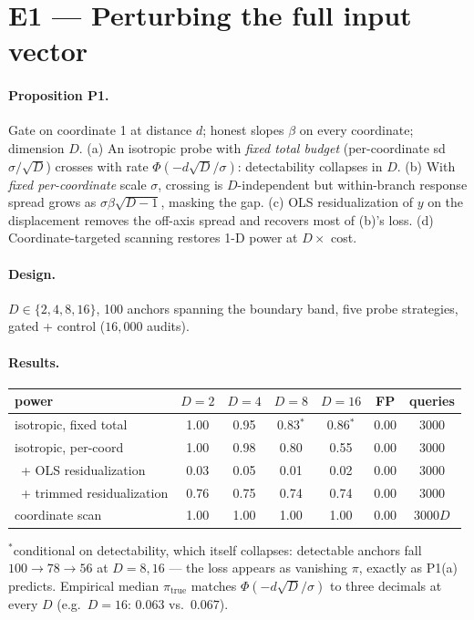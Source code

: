 \documentclass[11pt]{article}
\begin{document}
\section{E1 --- Perturbing the full input vector}

\paragraph{Proposition P1.} Gate on coordinate 1 at distance $d$; honest slopes $\beta$ on
every coordinate; dimension $D$.
(a) An isotropic probe with \emph{fixed total budget} (per-coordinate sd $\sigma/\sqrt D$)
crosses with rate $\Phi(-d\sqrt D/\sigma)$: detectability collapses in $D$.
(b) With \emph{fixed per-coordinate} scale $\sigma$, crossing is $D$-independent but
within-branch response spread grows as $\sigma\beta\sqrt{D-1}$, masking the gap.
(c) OLS residualization of $y$ on the displacement removes the off-axis spread and recovers
most of (b)'s loss.
(d) Coordinate-targeted scanning restores 1-D power at $D\times$ cost.

\paragraph{Design.} $D\in\{2,4,8,16\}$, 100 anchors spanning the boundary band, five probe
strategies, gated + control ($16{,}000$ audits).

\paragraph{Results.}
\begin{center}\small
\begin{tabular}{lcccccc}
\toprule
power & $D{=}2$ & $D{=}4$ & $D{=}8$ & $D{=}16$ & FP & queries\\
\midrule
isotropic, fixed total   & 1.00 & 0.95 & 0.83$^\ast$ & 0.86$^\ast$ & 0.00 & 3000\\
isotropic, per-coord     & 1.00 & 0.98 & 0.80 & 0.55 & 0.00 & 3000\\
\ + OLS residualization  & 0.03 & 0.05 & 0.01 & 0.02 & 0.00 & 3000\\
\ + trimmed residualization & 0.76 & 0.75 & 0.74 & 0.74 & 0.00 & 3000\\
coordinate scan          & 1.00 & 1.00 & 1.00 & 1.00 & 0.00 & $3000D$\\
\bottomrule
\end{tabular}
\end{center}
{\small $^\ast$conditional on detectability, which itself collapses: detectable anchors
fall $100\to 78\to 56$ at $D=8,16$ --- the loss appears as vanishing $\pi$, exactly as
P1(a) predicts. Empirical median $\pi_{\mathrm{true}}$ matches $\Phi(-d\sqrt D/\sigma)$ to
three decimals at every $D$ (e.g.\ $D{=}16$: $0.063$ vs.\ $0.067$).}
\end{document}
